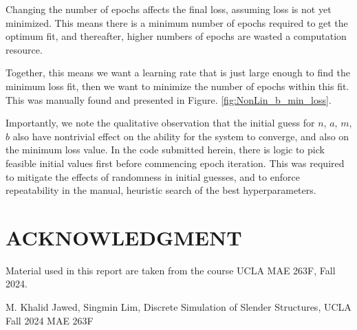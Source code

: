 \documentclass[letterpaper, 10 pt, conference]{ieeeconf}  %
\begin{document}
Changing the number of epochs affects the final loss, assuming loss is not yet minimized. 
This means there is a minimum number of epochs required to get the optimum fit, and thereafter, higher numbers of epochs are wasted a computation resource.

Together, this means we want a learning rate that is just large enough to find the minimum loss fit, then we want to minimize the number of epochs within this fit.
This was manually found and presented in Figure. \ref{fig:NonLin_b_min_loss}. 

Importantly, we note the qualitative observation that the initial guess for $n$, $a$, $m$, $b$ also have nontrivial effect on the ability for the system to converge, and also on the minimum loss value.
In the code submitted herein, there is logic to pick feasible initial values first before commencing epoch iteration. 
This was required to mitigate the effects of randomness in initial guesses, and to enforce repeatability in the manual, heuristic search of the best hyperparameters. 


\section*{ACKNOWLEDGMENT}

Material used in this report are taken from the course UCLA MAE 263F, Fall 2024.




\begin{thebibliography}{99}

 M. Khalid Jawed, Singmin Lim, Discrete Simulation of Slender Structures, UCLA Fall 2024 MAE 263F

\end{thebibliography}
\end{document}
